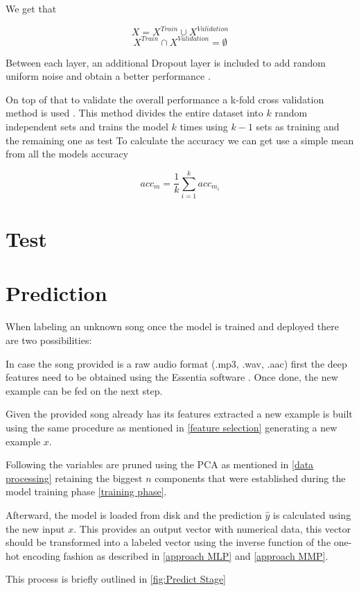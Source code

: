 We get that

$$X = X^{Train} \cup X^{Validation}$$
$$X^{Train} \cap X^{Validation} =  \emptyset $$

Between each layer, an additional Dropout layer is included to add random uniform noise and obtain a better performance \cite{Srivastava2014}.

On top of that to validate the overall performance a k-fold cross validation method is used \cite{Rodriguez2010}.
This method divides the entire dataset into $k$ random independent sets and trains the model $k$ times using $k - 1$ sets as training and the remaining one as test
To calculate the accuracy we can get use a simple mean from all the models accuracy

$$acc_{m} = \frac{1}{k}\sum_{i=1}^{k} acc_{m_{i}}$$



\section{Test}
\label{test stage}
\cite{Flach2015}
\cite{Davis2006}


\section{Prediction}

When labeling an unknown song once the model is trained and deployed there are two possibilities:

In case the song provided is a raw audio format (.mp3, .wav, .aac) first the deep features need to be obtained using the Essentia software \cite{essentia}. Once done, the new example can be fed on the next step.

Given the provided song already has its features extracted a new example is built using the same procedure as mentioned in \ref{feature selection} generating a new example $x$.

Following the variables are pruned using the PCA as mentioned in \ref{data processing} retaining the biggest $n$ components that were established during the model training phase \ref{training phase}.

Afterward, the model is loaded from disk and the prediction $\hat{y}$ is calculated using the new input $x$. 
This provides an output vector with numerical data, this vector should be transformed into a labeled vector using the inverse function of the one-hot encoding fashion as described in \ref{approach MLP} and \ref{approach MMP}.

This process is briefly outlined in \ref{fig:Predict Stage}


